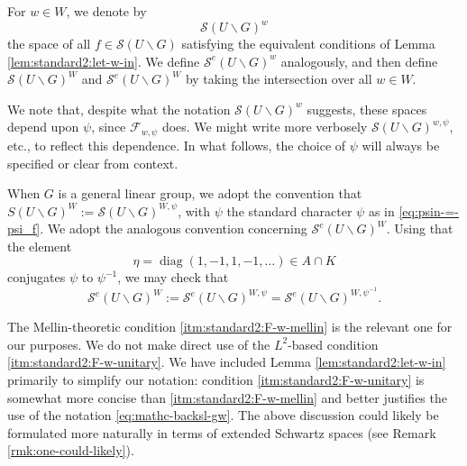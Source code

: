 \documentclass[reqno]{amsart}
\DeclareMathOperator{\diag}{diag}
\theoremstyle{plain} \newtheorem{theorem} {Theorem}
\theoremstyle{definition} \newtheorem{definition} [theorem] {Definition}
\theoremstyle{itplain} %
\numberwithin{equation}{section}
\numberwithin{theorem}{section}
\begin{document}
For $w \in W$, we denote by 
\begin{equation}\label{eq:mathc-backsl-gw}
  \mathcal{S}(U \backslash G)^w
\end{equation}
the space of all $f \in \mathcal{S}(U \backslash G)$ satisfying the equivalent conditions of Lemma \ref{lem:standard2:let-w-in}.  We define $\mathcal{S}^e(U \backslash G)^w$ analogously, and then define $\mathcal{S}(U \backslash G)^W$ and $\mathcal{S}^e(U \backslash G)^W$ by taking the intersection over all $w \in W$.  

\begin{remark}\label{rmk:we-note-that-dependence-psi-w}
  We note that, despite what the notation $\mathcal{S}(U \backslash G)^w$ suggests, these spaces depend upon $\psi$, since $\mathcal{F}_{w,\psi}$ does.  We might write more verbosely $\mathcal{S}(U \backslash G)^{w, \psi}$, etc., to reflect this dependence.  In what follows, the choice of $\psi$ will always be specified or clear from context.

  When $G$ is a general linear group, we adopt the convention that $S(U \backslash G)^W := \mathcal{S}(U \backslash G)^{W,\psi}$, with $\psi$ the standard character $\psi$ as in \eqref{eq:psin-=-psi_f}.  We adopt the analogous convention concerning $\mathcal{S}^e(U \backslash G)^W$.  Using that the element
  \begin{equation*}
\eta = \diag(1,-1,1,-1,\dotsc) \in A \cap K
\end{equation*}
conjugates $\psi$ to $\psi^{-1}$, we may check that
  \begin{equation}\label{eq:mathc-backsl-gw-1}
    \mathcal{S}^e(U \backslash G)^W := \mathcal{S}^e(U \backslash G)^{W,\psi} = \mathcal{S}^e(U \backslash G)^{W,\psi^{-1}}.
  \end{equation}
\end{remark}

\begin{remark}
  The Mellin-theoretic condition \eqref{itm:standard2:F-w-mellin} is the relevant one for our purposes.  We do not make direct use of the $L^2$-based condition \eqref{itm:standard2:F-w-unitary}.  We have included Lemma \ref{lem:standard2:let-w-in} primarily to simplify our notation: condition \eqref{itm:standard2:F-w-unitary} is somewhat more concise than \eqref{itm:standard2:F-w-mellin} and better justifies the use of the notation \eqref{eq:mathc-backsl-gw}.  The above discussion could likely be formulated more naturally in terms of extended Schwartz spaces (see Remark \ref{rmk:one-could-likely}).
\end{remark}
\end{document}

